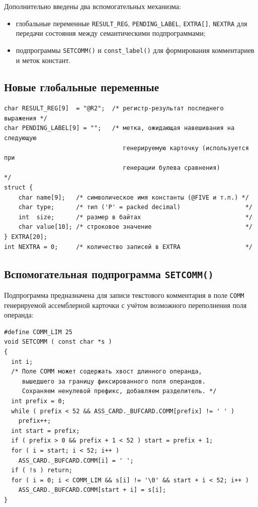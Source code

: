 \documentclass[a4paper,14pt]{extarticle}
\begin{document}
Дополнительно введены два вспомогательных механизма:
\begin{itemize}
  \item глобальные переменные \texttt{RESULT\_REG}, \texttt{PENDING\_LABEL},
        \texttt{EXTRA[]}, \texttt{NEXTRA} для передачи состояния между
        семантическими подпрограммами;
  \item подпрограммы \texttt{SETCOMM()} и \texttt{const\_label()} для
        формирования комментариев и меток констант.
\end{itemize}

\subsection{Новые глобальные переменные}

\begin{lstlisting}[style=Cstyle,caption={Новые глобальные переменные},label=lst:globals]
char RESULT_REG[9]  = "@R2";  /* регистр-результат последнего выражения */
char PENDING_LABEL[9] = "";   /* метка, ожидающая навешивания на следующую
                                 генерируемую карточку (используется при
                                 генерации булева сравнения)              */
struct {
    char name[9];   /* символическое имя константы (@FIVE и т.п.) */
    char type;      /* тип ('P' = packed decimal)                  */
    int  size;      /* размер в байтах                             */
    char value[10]; /* строковое значение                          */
} EXTRA[20];
int NEXTRA = 0;     /* количество записей в EXTRA                  */
\end{lstlisting}

\subsection{Вспомогательная подпрограмма \texttt{SETCOMM()}}

Подпрограмма предназначена для записи текстового комментария в поле \texttt{COMM}
генерируемой ассемблерной карточки с учётом возможного переполнения поля операнда:

\begin{lstlisting}[style=Cstyle,caption={Подпрограмма \texttt{SETCOMM()}},label=lst:setcomm]
#define COMM_LIM 25
void SETCOMM ( const char *s )
{
  int i;
  /* Поле COMM может содержать хвост длинного операнда,
     вышедшего за границу фиксированного поля операндов.
     Сохраняем ненулевой префикс, добавляем разделитель. */
  int prefix = 0;
  while ( prefix < 52 && ASS_CARD._BUFCARD.COMM[prefix] != ' ' )
    prefix++;
  int start = prefix;
  if ( prefix > 0 && prefix + 1 < 52 ) start = prefix + 1;
  for ( i = start; i < 52; i++ )
    ASS_CARD._BUFCARD.COMM[i] = ' ';
  if ( !s ) return;
  for ( i = 0; i < COMM_LIM && s[i] != '\0' && start + i < 52; i++ )
    ASS_CARD._BUFCARD.COMM[start + i] = s[i];
}
\end{lstlisting}
\end{document}
